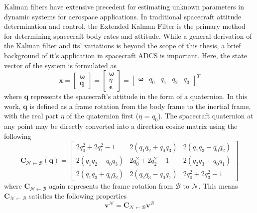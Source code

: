 Kalman filters have extensive precedent for estimating unknown parameters in dynamic systems for aerospace applications. In traditional spacecraft attitude determination and control, the Extended Kalman Filter is the primary method for determining spacecraft body rates and attitude. While a general derivation of the Kalman filter and its' variations is beyond the scope of this thesis, a brief background of it's application in spacecraft ADCS is important. Here, the state vector of the system is formulated as
\begin{equation}\label{equation:EKF_state_vec}
    \bm{x} = \begin{bmatrix}\bm{\omega} \\ \bm{q} \end{bmatrix}
    =\begin{bmatrix}
        \bm{\omega} \\ \eta \\ \bm{\epsilon}
    \end{bmatrix}
    =\begin{bmatrix}
        \bm{\omega} & q_0 & q_1 & q_2 & q_3
    \end{bmatrix}^T
\end{equation}
where $\bm{q}$ represents the spacecraft's attitude in the form of a quaternion. In this work, $\bm{q}$ is defined as a frame rotation from the body frame to the inertial frame, with the real part $\eta$ of the quaternion first ($\eta$ = $q_0$). The spacecraft quaternion at any point may be directly converted into a direction cosine matrix using the following
\begin{equation}\label{equation:C_from_q}
    \bm{C}_{\mathcal{N}\leftarrow\mathcal{B}}(\bm{q})=
    \begin{bmatrix}
    2q_0^{2}+2q_1^{2}-1 & 2(q_1 q_2 + q_0 q_3) & 2(q_1 q_3 - q_0 q_2) \\
    2(q_1 q_2 - q_0 q_3) & 2q_0^{2}+2q_2^{2}-1 & 2(q_2 q_3 + q_0 q_1) \\
    2(q_1 q_3 + q_0 q_2) & 2(q_2 q_3 - q_0 q_1) & 2q_0^{2}+2q_3^{2}-1
    \end{bmatrix}
\end{equation}
where $\bm{C}_{\mathcal{N}\leftarrow\mathcal{B}}$ again represents the frame rotation from $\mathcal{B}$ to $\mathcal{N}$. This means $\bm{C}_{\mathcal{N}\leftarrow\mathcal{B}}$ satisfies the following properties
\begin{equation}
    \bm{v}^{\mathcal{N}} = 
    \bm{C}_{\mathcal{N}\leftarrow\mathcal{B}}\bm{v}^{\mathcal{B}}
\end{equation}

